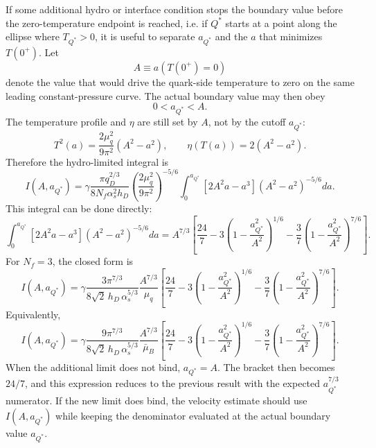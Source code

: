 \documentclass[11pt]{article}
\begin{document}
If some additional hydro or interface condition stops the boundary value before
the zero-temperature endpoint is reached, i.e. if $Q^*$ starts at a point along the ellipse where $T_{Q^*}>0$, it is useful to separate $a_{Q^*}$ and the $a$ that minimizes $T(0^+)$. Let
\begin{equation}
A\equiv a(T(0^+)=0)
\end{equation}
denote the value that would drive the quark-side temperature to zero on the
same leading constant-pressure curve. The actual boundary value may then obey
\begin{equation}
0<a_{Q^*}<A .
\end{equation}
The temperature profile and \(\eta\) are still set by \(A\), not by the cutoff
\(a_{Q^*}\):
\begin{equation}
T^2(a)
=
\frac{2\mu_q^2}{9\pi^2}
\left(A^2-a^2\right),
\qquad
\eta(T(a))=2\left(A^2-a^2\right).
\end{equation}
Therefore the hydro-limited integral is
\begin{equation}
I(A,a_{Q^*})
=
\gamma
\frac{\pi q_D^{2/3}}{8N_f\alpha_s^2h_D}
\left(\frac{2\mu_q^2}{9\pi^2}\right)^{-5/6}
\int_0^{a_{Q^*}}
\left[
2A^2a-a^3
\right]
\left(A^2-a^2\right)^{-5/6}da .
\end{equation}
This integral can be done directly:
\begin{equation}
\int_0^{a_{Q^*}}
\left[
2A^2a-a^3
\right]
\left(A^2-a^2\right)^{-5/6}da
=
A^{7/3}
\left[
\frac{24}{7}
-3\left(1-\frac{a_{Q^*}^2}{A^2}\right)^{1/6}
-\frac{3}{7}
\left(1-\frac{a_{Q^*}^2}{A^2}\right)^{7/6}
\right].
\end{equation}
For \(N_f=3\), the closed form is
\begin{equation}
I(A,a_{Q^*})
=
\gamma
\frac{
3\pi^{7/3}
}{
8\sqrt{2}\,h_D\,\alpha_s^{5/3}
}
\frac{A^{7/3}}{\mu_q}
\left[
\frac{24}{7}
-3\left(1-\frac{a_{Q^*}^2}{A^2}\right)^{1/6}
-\frac{3}{7}
\left(1-\frac{a_{Q^*}^2}{A^2}\right)^{7/6}
\right].
\end{equation}
Equivalently,
\begin{equation}
I(A,a_{Q^*})
=
\gamma
\frac{
9\pi^{7/3}
}{
8\sqrt{2}\,h_D\,\alpha_s^{5/3}
}
\frac{A^{7/3}}{\bar\mu_B}
\left[
\frac{24}{7}
-3\left(1-\frac{a_{Q^*}^2}{A^2}\right)^{1/6}
-\frac{3}{7}
\left(1-\frac{a_{Q^*}^2}{A^2}\right)^{7/6}
\right].
\end{equation}
When the additional limit does not bind, \(a_{Q^*}=A\). The bracket then becomes
\(24/7\), and this expression reduces to the previous result with the expected
\(a_{Q^*}^{7/3}\) numerator. If the new limit does bind, the velocity estimate
should use \(I(A,a_{Q^*})\) while keeping the denominator evaluated at the
actual boundary value \(a_{Q^*}\).
\end{document}
